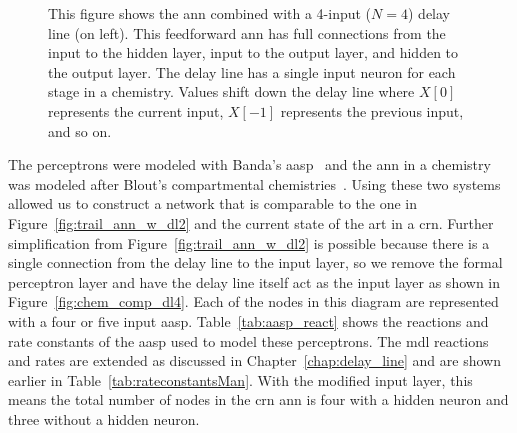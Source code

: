 \begin{figure}
\caption[Delay Line with ANN in Chemistry]{This figure shows the \gls{ann} combined with a 4-input ($N=4$) delay line (on left). This feedforward \gls{ann} has full connections from the input to the hidden layer, input to the output layer, and hidden to the output layer. The delay line has a single input neuron for each stage in a chemistry. Values shift down the delay line where $X[0]$ represents the current input, $X[-1]$ represents the previous input, and so on.}
\label{fig:chem_trail_ann_dl4}
\end{figure}

The perceptrons were modeled with Banda's \gls{aasp}~\cite{Banda2014-kg} and the \gls{ann} in a chemistry was modeled after Blout's compartmental chemistries~\cite{Blount_undated-ro}. Using these two systems allowed us to construct a network that is comparable to the one in Figure~\ref{fig:trail_ann_w_dl2} and the current state of the art in a \gls{crn}. Further simplification from Figure~\ref{fig:trail_ann_w_dl2} is possible because there is a single connection from the delay line to the input layer, so we remove the formal perceptron layer and have the delay line itself act as the input layer as shown in Figure~\ref{fig:chem_comp_dl4}. Each of the nodes in this diagram are represented with a four or five input \gls{aasp}. Table~\ref{tab:aasp_react} shows the reactions and rate constants of the \gls{aasp} used to model these perceptrons. The \gls{mdl} reactions and rates are extended as discussed in Chapter~\ref{chap:delay_line} and are shown earlier in Table~\ref{tab:rateconstantsMan}. With the modified input layer, this means the total number of nodes in the \gls{crn} \gls{ann} is four with a hidden neuron and three without a hidden neuron.


